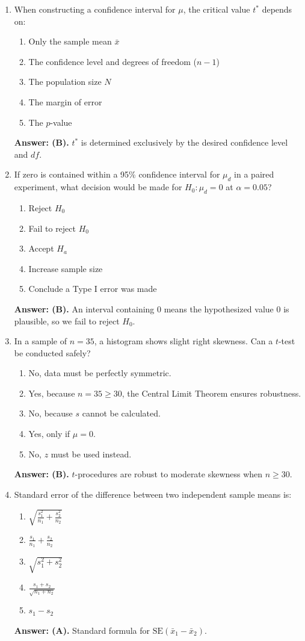 \begin{enumerate}[resume, leftmargin=1.5em]
  \item When constructing a confidence interval for $\mu$, the critical value $t^*$ depends on:
  \begin{enumerate}[label=(\Alph*)]
    \item Only the sample mean $\bar{x}$
    \item The confidence level and degrees of freedom ($n - 1$)
    \item The population size $N$
    \item The margin of error
    \item The $p$-value
  \end{enumerate}
  \textbf{Answer: (B).} $t^*$ is determined exclusively by the desired confidence level and $df$.

  \item If zero is contained within a 95\% confidence interval for $\mu_d$ in a paired experiment, what decision would be made for $H_0: \mu_d = 0$ at $\alpha = 0.05$?
  \begin{enumerate}[label=(\Alph*)]
    \item Reject $H_0$ \item Fail to reject $H_0$ \item Accept $H_a$ \item Increase sample size \item Conclude a Type I error was made
  \end{enumerate}
  \textbf{Answer: (B).} An interval containing 0 means the hypothesized value 0 is plausible, so we fail to reject $H_0$.

  \item In a sample of $n = 35$, a histogram shows slight right skewness. Can a $t$-test be conducted safely?
  \begin{enumerate}[label=(\Alph*)]
    \item No, data must be perfectly symmetric.
    \item Yes, because $n = 35 \ge 30$, the Central Limit Theorem ensures robustness.
    \item No, because $s$ cannot be calculated.
    \item Yes, only if $\mu = 0$.
    \item No, $z$ must be used instead.
  \end{enumerate}
  \textbf{Answer: (B).} $t$-procedures are robust to moderate skewness when $n \ge 30$.

  \item Standard error of the difference between two independent sample means is:
  \begin{enumerate}[label=(\Alph*)]
    \item $\sqrt{\frac{s_1^2}{n_1} + \frac{s_2^2}{n_2}}$ \item $\frac{s_1}{n_1} + \frac{s_2}{n_2}$ \item $\sqrt{s_1^2 + s_2^2}$ \item $\frac{s_1 + s_2}{\sqrt{n_1 + n_2}}$ \item $s_1 - s_2$
  \end{enumerate}
  \textbf{Answer: (A).} Standard formula for $\text{SE}(\bar{x}_1 - \bar{x}_2)$.


\end{enumerate}
